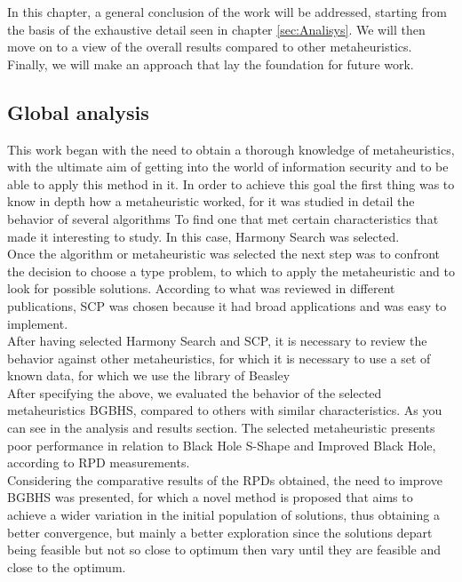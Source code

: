 In this chapter, a general conclusion of the work will be addressed, starting from the basis of the exhaustive detail seen in chapter \ref{sec:Analisys}.
We will then move on to a view of the overall results compared to other metaheuristics. Finally, we will make an approach that lay the foundation for future work.

\subsection{Global analysis}
This work began with the need to obtain a thorough knowledge of metaheuristics, with the ultimate aim of getting into the world of information security and to be able to apply this method in it. In order to achieve this goal the first thing was to know in depth how a metaheuristic worked, for it was studied in detail the behavior of several algorithms
To find one that met certain characteristics that made it interesting to study. In this case, Harmony Search was selected.\\

Once the algorithm or metaheuristic was selected the next step was to confront the decision to choose a type problem, to which to apply the metaheuristic and to look for possible solutions. According to what was reviewed in different publications, SCP was chosen because it had broad applications and was easy to implement.\\

After having selected Harmony Search and SCP, it is necessary to review the behavior against other metaheuristics, for which it is necessary to use a set of known data, for which we use the library of Beasley\\

After specifying the above, we evaluated the behavior of the selected metaheuristics BGBHS, compared to others with similar characteristics. As you can see in the analysis and results section. The selected metaheuristic presents poor performance in relation to Black Hole S-Shape and Improved Black Hole, according to RPD measurements.\\

Considering the comparative results of the RPDs obtained, the need to improve BGBHS was presented, for which a novel method is proposed that aims to achieve a wider variation in the initial population of solutions, thus obtaining a better convergence, but mainly a better exploration since the solutions depart being feasible but not so close to optimum then vary until they are feasible and close to the optimum.\\

